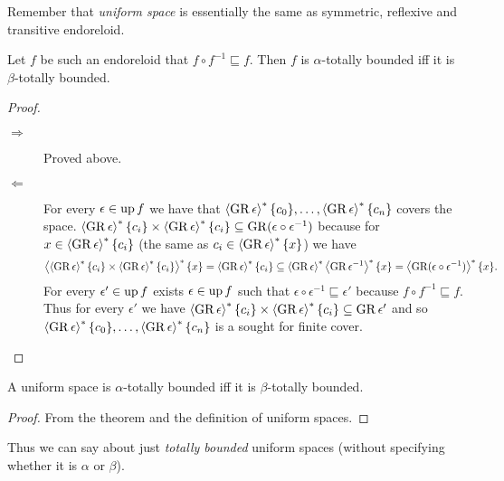 Remember that \emph{uniform space} is essentially the same as symmetric,
reflexive and transitive endoreloid.
\begin{thm}
Let $f$ be such an endoreloid that $f\circ f^{-1}\sqsubseteq f$.
Then $f$ is $\alpha$-totally bounded iff it is $\beta$-totally
bounded.\end{thm}
\begin{proof}
~
\begin{description}
\item [{$\Rightarrow$}] Proved above.
\item [{$\Leftarrow$}] For every $\epsilon\in\operatorname{up} f$ we have that $\left\langle \operatorname{GR}\epsilon\right\rangle ^{\ast}\{c_{0}\},\dots,\left\langle \operatorname{GR}\epsilon\right\rangle ^{\ast}\{c_{n}\}$
covers the space. $\left\langle \operatorname{GR}\epsilon\right\rangle ^{\ast}\{c_{i}\}\times\left\langle \operatorname{GR}\epsilon\right\rangle ^{\ast}\{c_{i}\}\subseteq\operatorname{GR}(\epsilon\circ\epsilon^{-1})$
because for $x\in\left\langle \operatorname{GR}\epsilon\right\rangle ^{\ast}\{c_{i}\}$ (the same as $c_{i}\in\left\langle \operatorname{GR}\epsilon\right\rangle ^{\ast}\{x\}$)
we have 
\[
\left\langle \left\langle \operatorname{GR}\epsilon\right\rangle ^{\ast}\{c_{i}\}\times\left\langle \operatorname{GR}\epsilon\right\rangle ^{\ast}\{c_{i}\}\right\rangle ^{\ast}\{x\}=\left\langle \operatorname{GR}\epsilon\right\rangle ^{\ast}\{c_{i}\}\subseteq\left\langle \operatorname{GR}\epsilon\right\rangle ^{\ast}\left\langle \operatorname{GR}\epsilon^{-1}\right\rangle ^{\ast}\{x\}=\left\langle \operatorname{GR}(\epsilon\circ\epsilon^{-1})\right\rangle ^{\ast}\{x\}.
\]
For every $\epsilon'\in\operatorname{up} f$ exists $\epsilon\in\operatorname{up} f$ such that
$\epsilon\circ\epsilon^{-1}\sqsubseteq\epsilon'$ because $f\circ f^{-1}\sqsubseteq f$.
Thus for every $\epsilon'$ we have $\left\langle \operatorname{GR}\epsilon\right\rangle ^{\ast}\{c_{i}\}\times\left\langle \operatorname{GR}\epsilon\right\rangle ^{\ast}\{c_{i}\}\subseteq\operatorname{GR}\epsilon'$
and so $\left\langle \operatorname{GR}\epsilon\right\rangle ^{\ast}\{c_{0}\},\dots,\left\langle \operatorname{GR}\epsilon\right\rangle ^{\ast}\{c_{n}\}$
is a sought for finite cover.
\end{description}
\end{proof}
\begin{cor}
A uniform space is $\alpha$-totally bounded iff it is $\beta$-totally
bounded.\end{cor}
\begin{proof}
From the theorem and the definition of uniform spaces.
\end{proof}
Thus we can say about just \emph{totally bounded} uniform spaces (without
specifying whether it is $\alpha$ or $\beta$).


